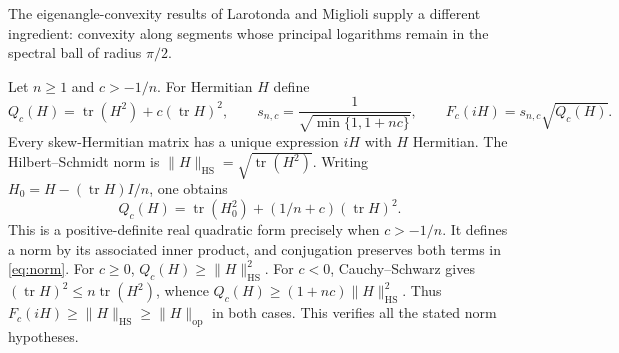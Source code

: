 \documentclass[11pt]{article}
\newcommand{\tr}{\operatorname{tr}}
\newcommand{\op}{\mathrm{op}}
\newcommand{\HS}{\mathrm{HS}}
\begin{document}
The eigenangle-convexity results of Larotonda and Miglioli
\cite[Theorems 4.2 and 5.9]{LM} supply a different ingredient:
convexity along segments whose principal logarithms remain in the
spectral ball of radius $\pi/2$.

Let $n\geq1$ and $c>-1/n$. For Hermitian $H$ define
\begin{equation}\label{eq:norm}
 Q_c(H)=\tr(H^2)+c(\tr H)^2,\qquad
 s_{n,c}=\frac1{\sqrt{\min\{1,1+nc\}}},\qquad
 F_c(iH)=s_{n,c}\sqrt{Q_c(H)}.
\end{equation}
Every skew-Hermitian matrix has a unique expression $iH$ with $H$ Hermitian.
The Hilbert--Schmidt norm is $\|H\|_{\HS}=\sqrt{\tr(H^2)}$.
Writing $H_0=H-(\tr H)I/n$, one obtains
\begin{equation}\label{eq:split}
 Q_c(H)=\tr(H_0^2)+(1/n+c)(\tr H)^2.
\end{equation}
This is a positive-definite real quadratic form precisely when $c>-1/n$.
It defines a norm by its associated inner product, and conjugation
preserves both terms in \eqref{eq:norm}.
For $c\geq0$, $Q_c(H)\geq\|H\|_{\HS}^2$.
For $c<0$, Cauchy--Schwarz gives $(\tr H)^2\leq n\tr(H^2)$, whence
$Q_c(H)\geq(1+nc)\|H\|_{\HS}^2$.
Thus $F_c(iH)\geq\|H\|_{\HS}\geq\|H\|_{\op}$ in both cases.
This verifies all the stated norm hypotheses.
\end{document}
